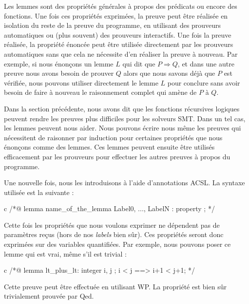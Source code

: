 
Les lemmes sont des propriétés générales à propos des prédicats ou encore des
fonctions. Une fois ces propriétés exprimées, la preuve peut être réalisée en
isolation du reste de la preuve du programme, en utilisant des prouveurs
automatiques ou (plus souvent) des prouveurs interactifs. Une fois la preuve
réalisée, la propriété énoncée peut être utilisée directement par les prouveurs
automatiques sans que cela ne nécessite d'en réaliser la preuve à nouveau. Par
exemple, si nous énonçons un lemme $L$ qui dit que $P \Rightarrow Q$, et dans
une autre preuve nous avons besoin de prouver $Q$ alors que nous savons déjà
que $P$ est vérifiée, nous pouvons utiliser directement le lemme $L$ pour
conclure sans avoir besoin de faire à nouveau le raisonnement complet qui
amène de $P$ à $Q$.



Dans la section précédente, nous avons dit que les fonctions récursives logiques
peuvent rendre les preuves plus difficiles pour les solveurs SMT. Dans un tel cas,
les lemmes peuvent nous aider. Nous pouvons écrire nous même les preuves qui
nécessitent de raisonner par induction pour certaines propriétés que nous
énonçons comme des lemmes. Ces lemmes peuvent ensuite être utilisés
efficacement par les prouveurs pour effectuer les autres preuves à propos du
programme.




Une nouvelle fois, nous les introduisons à l'aide d'annotations ACSL. La syntaxe
utilisée est la suivante :



\begin{CodeBlock}{c}
/*@
  lemma name_of_the_lemma { Label0, ..., LabelN }:
    property ;
*/
\end{CodeBlock}



Cette fois les propriétés que nous voulons exprimer ne dépendent pas de
paramètres reçus (hors de nos \textit{labels} bien sûr). Ces propriétés seront donc
exprimées sur des variables quantifiées. Par exemple, nous pouvons poser ce
lemme qui est vrai, même s'il est trivial :



\begin{CodeBlock}{c}
/*@
  lemma lt_plus_lt:
    \forall integer i, j ; i < j ==> i+1 < j+1;
*/
\end{CodeBlock}



Cette preuve peut être effectuée en utilisant WP. La propriété est bien sûr
trivialement prouvée par Qed.



